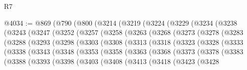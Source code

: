 \begin{lexlean}{R7}
\begin{coremodule}
@4034 := @869
    (@790
      (@800
        (@3214
          (@3219
            (@3224
              (@3229
                (@3234
                  (@3238
                    (@3243
                      (@3247
                        (@3252
                          (@3257
                            (@3258
                              (@3263
                                (@3268
                                  (@3273
                                    (@3278
                                      (@3283
                                        (@3288
                                          (@3293
                                            (@3298
                                              (@3303
                                                (@3308
                                                  (@3313
                                                    (@3318
                                                      (@3323
                                                        (@3328
                                                          (@3333
                                                            (@3338
                                                              (@3343
                                                                (@3348
                                                                  (@3353
                                                                    (@3358
                                                                      (@3363
                                                                        (@3368
                                                                          (@3373
                                                                            (@3378
                                                                              (@3383
                                                                                (@3388
                                                                                  (@3393
                                                                                    (@3398
                                                                                      (@3403
                                                                                        (@3408
                                                                                          (@3413
                                                                                            (@3418
                                                                                              (@3423
                                                                                                (@3428

\end{coremodule}
\end{lexlean}
